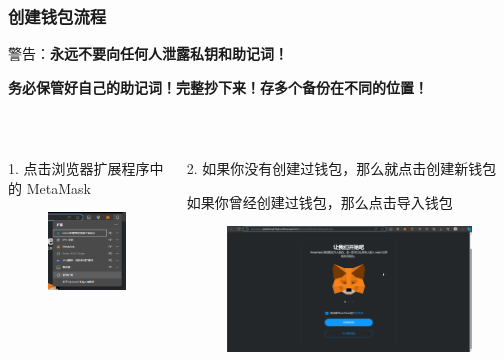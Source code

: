 \documentclass{beamer}
\begin{document}
\begin{frame}
    \frametitle{创建钱包流程}
    警告：\textbf{永远不要向任何人泄露私钥和助记词！}

    \textbf{务必保管好自己的助记词！完整抄下来！存多个备份在不同的位置！}

    \

    \begin{columns}
        \begin{column}{0.4\textwidth}
            1. 点击浏览器扩展程序中的 MetaMask
            \begin{figure}[htbp]
                \centering
                \includegraphics[width=\textwidth]{m1.png}
            \end{figure}
        \end{column}
        \begin{column}{0.5\textwidth} 
            2. 如果你没有创建过钱包，那么就点击创建新钱包

            如果你曾经创建过钱包，那么点击导入钱包
            \begin{figure}[htbp]
                \centering
                \includegraphics[width=\textwidth]{m2.png}
            \end{figure}
        \end{column}
    \end{columns}

\end{frame}
\end{document}
